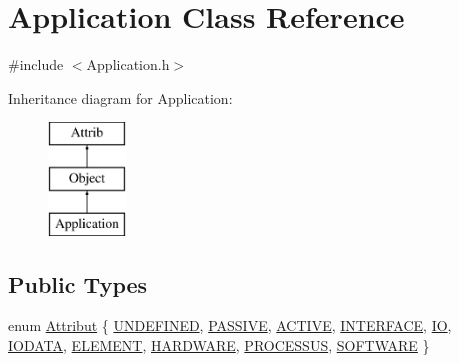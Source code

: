 \hypertarget{classApplication}{}\section{Application Class Reference}
\label{classApplication}


{\ttfamily \#include $<$Application.\+h$>$}

Inheritance diagram for Application\+:\begin{figure}[H]
\begin{center}
\leavevmode
\includegraphics[height=3.000000cm]{classApplication}
\end{center}
\end{figure}
\subsection*{Public Types}
\begin{DoxyCompactItemize}
\item 
enum \hyperlink{classAttrib_a69e171d7cc6417835a5a306d3c764235}{Attribut} \{ \newline
\hyperlink{classAttrib_a69e171d7cc6417835a5a306d3c764235a3a8da2ab97dda18aebab196fe4100531}{U\+N\+D\+E\+F\+I\+N\+ED}, 
\hyperlink{classAttrib_a69e171d7cc6417835a5a306d3c764235a2bfb2af57b87031d190a05fe25dd92ed}{P\+A\+S\+S\+I\+VE}, 
\hyperlink{classAttrib_a69e171d7cc6417835a5a306d3c764235a3b1fec929c0370d1436f2f06e298fb0d}{A\+C\+T\+I\+VE}, 
\hyperlink{classAttrib_a69e171d7cc6417835a5a306d3c764235aa27c16b480a369ea4d18b07b2516bbc7}{I\+N\+T\+E\+R\+F\+A\+CE}, 
\newline
\hyperlink{classAttrib_a69e171d7cc6417835a5a306d3c764235a1420a5b8c0540b2af210b6975eded7f9}{IO}, 
\hyperlink{classAttrib_a69e171d7cc6417835a5a306d3c764235a0af3b0d0ac323c1704e6c69cf90add28}{I\+O\+D\+A\+TA}, 
\hyperlink{classAttrib_a69e171d7cc6417835a5a306d3c764235a7788bc5dd333fd8ce18562b269c9dab1}{E\+L\+E\+M\+E\+NT}, 
\hyperlink{classAttrib_a69e171d7cc6417835a5a306d3c764235a61ceb22149f365f1780d18f9d1459423}{H\+A\+R\+D\+W\+A\+RE}, 
\newline
\hyperlink{classAttrib_a69e171d7cc6417835a5a306d3c764235a75250e29692496e73effca2c0330977f}{P\+R\+O\+C\+E\+S\+S\+US}, 
\hyperlink{classAttrib_a69e171d7cc6417835a5a306d3c764235a103a67cd0b8f07ef478fa45d4356e27b}{S\+O\+F\+T\+W\+A\+RE}
 \}
\end{DoxyCompactItemize}
